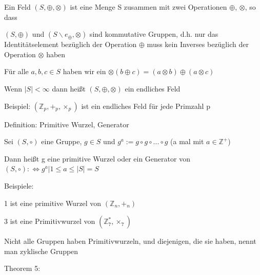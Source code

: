 \documentclass[a4paper]{article}
\begin{document}
\begin{multicols}{3}
\begin{itemize*}
\begin{itemize*}
                  \begin{itemize*}
                        \item Ein Feld $(S,\oplus, \otimes)$ ist eine Menge S zusammen mit zwei Operationen $\oplus$, $\otimes$, so dass
                        \begin{itemize*}
                              \item $(S,\oplus)$ und $(S\backslash{e_{\oplus}},\otimes)$ sind kommutative Gruppen, d.h. nur das Identitätselement bezüglich der Operation $\oplus$ muss kein Inverses bezüglich der Operation $\otimes$ haben
                              \item Für alle $a,b,c\in S$ haben wir ein $\otimes(b\oplus c)=(a\otimes b)\oplus(a\otimes c)$
                        \end{itemize*}
                  \end{itemize*}
                  \item Wenn $| S|<\infty$ dann heißt $(S,\oplus,\otimes)$ ein endliches Feld
            \end{itemize*}
            \item Beispiel: $(\mathbb{Z}_p, +_p, \times_p)$ ist ein endliches Feld für jede Primzahl p
            \item Definition: Primitive Wurzel, Generator
            \begin{itemize*}
                  \item Sei $(S,\circ)$ eine Gruppe, $g\in S$ und $g^a:=g\circ g\circ...\circ g$ (a mal mit $a\in\mathbb{Z}^+$)
                  \item Dann heißt g eine primitive Wurzel oder ein Generator von $(S,\circ):\Leftrightarrow{g^a|1\leq a\leq | S|}=S$
                  \item Beispiele:
                  \begin{itemize*}
                        \item 1 ist eine primitive Wurzel von $(\mathbb{Z}_n, +_n)$
                        \item 3 ist eine Primitivwurzel von $(\mathbb{Z}^*_7, \times_7)$
                  \end{itemize*}
                  \item Nicht alle Gruppen haben Primitivwurzeln, und diejenigen, die sie haben, nennt man zyklische Gruppen
            \end{itemize*}
            \item Theorem 5:
            \begin{itemize*}

\end{itemize*}
\end{itemize*}
\end{multicols}
\end{document}
